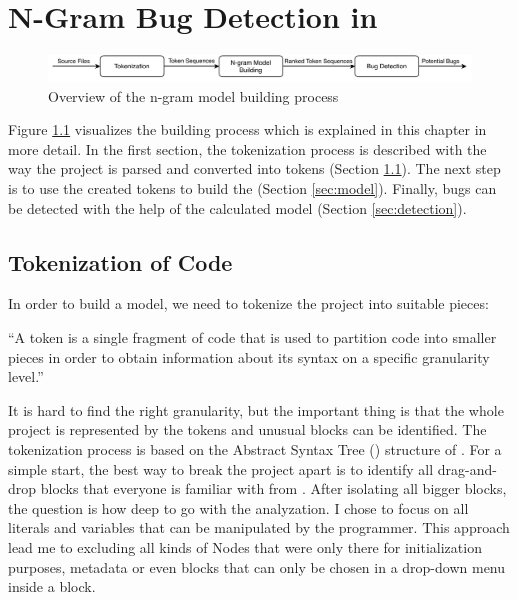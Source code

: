\chapter{N-Gram Bug Detection in \scratch{}}\label{chap:methods}

\begin{figure}[hbtp]
\centering
\includegraphics[scale=0.75]{images/Overview.pdf}
\caption{Overview of the n-gram model building process}
\label{fig:overview}
\end{figure}

Figure \ref{fig:overview} visualizes the \ngram{} building process which is explained in this chapter in more detail. In the first section, the tokenization process is described with the way the \scratch{} project is parsed and converted into tokens (Section \ref{sec:tokenization}). The next step is to use the created tokens to build the \ngram{} (Section \ref{sec:model}). Finally, bugs can be detected with the help of the calculated model (Section \ref{sec:detection}).

\section{Tokenization of \scratch{} Code}\label{sec:tokenization}
In order to build a model, we need to tokenize the \scratch{} project into suitable pieces:

\begin{definition}[Token]\label{def:token}
    ``A token is a single fragment of \scratch{} code that is used to partition code into smaller pieces in order to obtain information about its syntax on a specific granularity level.''
\end{definition}

It is hard to find the right granularity, but the important thing is that the whole project is represented by the tokens and unusual blocks can be identified. The tokenization process is based on the Abstract Syntax Tree (\AST{}) structure of \litterbox{}. For a simple start, the best way to break the project apart is to identify all drag-and-drop blocks that everyone is familiar with from \scratch{}. After isolating all bigger blocks, the question is how deep to go with the analyzation. I chose to focus on all literals and variables that can be manipulated by the \scratch{} programmer. This approach lead me to excluding all kinds of \AST{}Nodes that were only there for initialization purposes, metadata or even blocks that can only be chosen in a drop-down menu inside a block.  


